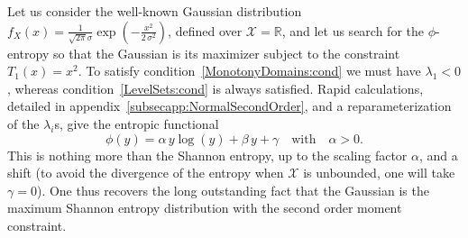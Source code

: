 \documentclass[entropy,article,submit,moreauthors,pdftex]{Definitions/mdpi}
\newcounter{GaussExample}%
\newcommand{\SZ}[1]{{\color{blue} #1}}                                       %
\def\Rset{\mathbb{R}}%
\def\X{\mathcal{X}}%
\begin{document}
\begin{Example}\label{Gauss:ex}\setcounter{GaussExample}{\value{example}}
  Let   us   consider   the   well-known   Gaussian   distribution   $f_X(x)   =
  \frac{1}{\sqrt{2 \pi} \sigma} \exp\left( - \frac{x^2}{2 \, \sigma^2} \right)$,
  defined over $\X  = \Rset$, and let  us search for the  $\phi$-entropy so that
  the Gaussian  is its maximizer subject  to the constraint $T_1(x)  = x^2$.  To
  satisfy condition~\ref{MonotonyDomains:cond} we must have $\lambda_1 < 0$\SZ{,
    whereas  condition~\ref{LevelSets:cond}  is  always  satisfied}.   \SZ{Rapid
    calculations, detailed in  appendix~\ref{subsecapp:NormalSecondOrder}, and a
    reparameterization    of    the     $\lambda_i$s,    give    the    entropic
    functional} $$\phi(y)  = \alpha  \, y \log(y)  + \beta \,  y +  \gamma \quad
  \mbox{with} \quad \alpha > 0.$$ This is nothing more than the Shannon entropy,
  up to the scaling factor $\alpha$, and a shift \SZ{(to avoid the divergence of
    the entropy when $\X$ is unbounded, one  will take $\gamma = 0$)}.  One thus
  recovers the  long outstanding fact that  the Gaussian is the  maximum Shannon
  entropy distribution with the second order moment constraint.
\end{Example}
%
\end{document}
